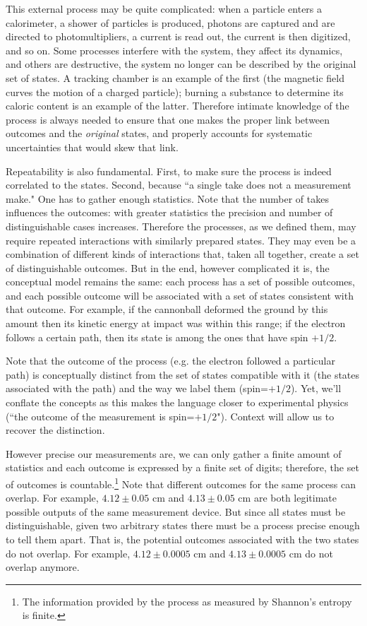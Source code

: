 \documentclass[smallextended]{svjour3}
\numberwithin{equation}{section}
\theoremstyle{definition}
\begin{document}
This external process may be quite complicated: when a particle enters a calorimeter, a shower of particles is produced, photons are captured and are directed to photomultipliers, a current is read out, the current is then digitized, and so on. Some processes interfere with the system, they affect its dynamics, and others are destructive, the system no longer can be described by the original set of states. A tracking chamber is an example of the first (the magnetic field curves the motion of a charged particle); burning a substance to determine its caloric content is an example of the latter. Therefore intimate knowledge of the process is always needed to ensure that one makes the proper link between outcomes and the \emph{original} states, and properly accounts for systematic uncertainties that would skew that link.

Repeatability is also fundamental. First, to make sure the process is indeed correlated to the states. Second, because ``a single take does not a measurement make." One has to gather enough statistics. Note that the number of takes influences the outcomes: with greater statistics the precision and number of distinguishable cases increases. Therefore the processes, as we defined them, may require repeated interactions with similarly prepared states. They may even be a combination of different kinds of interactions that, taken all together, create a set of distinguishable outcomes. But in the end, however complicated it is, the conceptual model remains the same: each process has a set of possible outcomes, and each possible outcome will be associated with a set of states consistent with that outcome. For example, if the cannonball deformed the ground by this amount then its kinetic energy at impact was within this range; if the electron follows a certain path, then its state is among the ones that have spin $+1/2$.

Note that the outcome of the process (e.g. the electron followed a particular path) is conceptually distinct from the set of states compatible with it (the states associated with the path) and the way we label them (spin=$+1/2$). Yet,  we'll conflate the concepts as this makes the language closer to experimental physics (``the outcome of the measurement is spin=$+1/2$"). Context will allow us to recover the distinction.

However precise our measurements are, we can only gather a finite amount of statistics and each outcome is expressed by a finite set of digits; therefore, the set of outcomes is countable.\footnote{The information provided by the process as measured by Shannon's entropy~\cite{Shannon,Jaynes} is finite.} Note that different outcomes for the same process can overlap. For example, $4.12 \pm 0.05$ cm and $4.13 \pm 0.05$ cm are both legitimate possible outputs of the same measurement device. But since all states must be distinguishable, given two arbitrary states there must be a process precise enough to tell them apart. That is, the potential outcomes associated with the two states do not overlap. For example, $4.12 \pm 0.0005$ cm and $4.13 \pm 0.0005$ cm do not overlap anymore.
\end{document}
